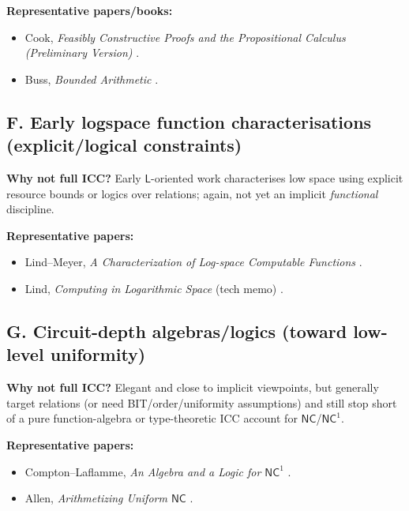 \noindent\textbf{Representative papers/books:}
\begin{itemize}
  \item Cook, \emph{Feasibly Constructive Proofs and the Propositional Calculus (Preliminary Version)} \cite{Cook1975}.
  \item Buss, \emph{Bounded Arithmetic} \cite{Buss1986}.
\end{itemize}

\subsection*{F. Early logspace function characterisations (explicit/logical constraints)}
\textbf{Why not full ICC?} Early \(\mathsf{L}\)-oriented work characterises low space using explicit resource
bounds or logics over relations; again, not yet an implicit \emph{functional} discipline.

\noindent\textbf{Representative papers:}
\begin{itemize}
  \item Lind--Meyer, \emph{A Characterization of Log-space Computable Functions} \cite{LindMeyer1973}.
  \item Lind, \emph{Computing in Logarithmic Space} (tech memo) \cite{Lind1974}.
\end{itemize}

\subsection*{G. Circuit-depth algebras/logics (toward low-level uniformity)}
\textbf{Why not full ICC?} Elegant and close to implicit viewpoints, but generally target relations
(or need BIT/order/uniformity assumptions) and still stop short of a pure function-algebra
or type-theoretic ICC account for \(\mathsf{NC}\)/\(\mathsf{NC}^1\).

\noindent\textbf{Representative papers:}
\begin{itemize}
  \item Compton--Laflamme, \emph{An Algebra and a Logic for \(\mathsf{NC}^{1}\)} \cite{ComptonLaflamme1990}.
  \item Allen, \emph{Arithmetizing Uniform \(\mathsf{NC}\)} \cite{Allen1991}.
\end{itemize}

